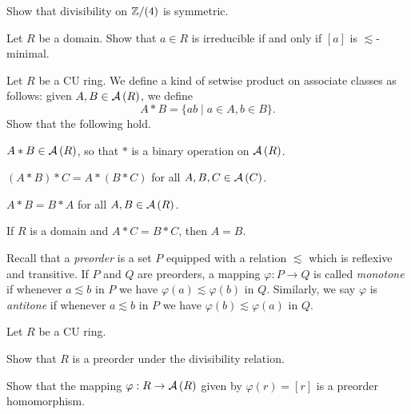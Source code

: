 \begin{exercise}
Show that divisibility on \(\mathbb{Z}/(4)\) is symmetric.
\end{exercise}


\begin{exercise}
Let \(R\) be a domain.
Show that \(a \in R\) is irreducible if and only if \([a]\) is \(\lesssim\)-minimal.
\end{exercise}


\begin{exercise} \label{exerc:assoc-prod}
Let \(R\) be a CU ring.
We define a kind of setwise product on associate classes as follows: given \(A,B \in  \mathcal{A}\left(R\right) \), we define \[ A \ast B = \{ ab \mid a \in A, b \in B \}. \]
Show that the following hold.
\begin{proplist*}
\item \(A \ast B \in  \mathcal{A}\left(R\right) \), so that \(\ast\) is a binary operation on \( \mathcal{A}\left(R\right) \).
\item \((A \ast B) \ast C = A \ast (B \ast C)\) for all \(A,B,C \in  \mathcal{A}\left(C\right) \).
\item \(A \ast B = B \ast A\) for all \(A,B \in  \mathcal{A}\left(R\right) \).
\item \label{exerc:assoc-prod:cancel} If \(R\) is a domain and \(A \ast C = B \ast C\), then \(A = B\).
\end{proplist*}
\end{exercise}


\begin{dfn}
Recall that a \emph{preorder} is a set \(P\) equipped with a relation \(\lesssim\) which is reflexive and transitive.
If \(P\) and \(Q\) are preorders, a mapping \(\varphi : P \rightarrow Q\) is called \emph{monotone} if whenever \(a \lesssim b\) in \(P\) we have \(\varphi(a) \lesssim \varphi(b)\) in \(Q\).
Similarly, we say \(\varphi\) is \emph{antitone} if whenever \(a \lesssim b\) in \(P\) we have \(\varphi(b) \lesssim \varphi(a)\) in \(Q\).
\end{dfn}


\begin{exercise}
Let \(R\) be a CU ring.
\begin{proplist*}
\item Show that \(R\) is a preorder under the divisibility relation.
\item Show that the mapping \(\varphi : R \rightarrow  \mathcal{A}\left(R\right) \) given by \(\varphi(r) = [r]\) is a preorder homomorphism.
\end{proplist*}
\end{exercise}


